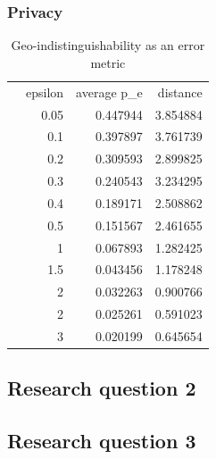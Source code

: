 \subsubsection{Privacy}
\begin{table}[h]
  \caption{Geo-indistinguishability as an error metric}
  \begin{tabular}{lrrr}
     & epsilon & average p\_e & distance \\
     & 0.05    & 0.447944     & 3.854884 \\
     & 0.1     & 0.397897     & 3.761739 \\
     & 0.2     & 0.309593     & 2.899825 \\
     & 0.3     & 0.240543     & 3.234295 \\
     & 0.4     & 0.189171     & 2.508862 \\
     & 0.5     & 0.151567     & 2.461655 \\
     & 1       & 0.067893     & 1.282425 \\
     & 1.5     & 0.043456     & 1.178248 \\
     & 2       & 0.032263     & 0.900766 \\
     & 2       & 0.025261     & 0.591023 \\
     & 3       & 0.020199     & 0.645654 \\
  \end{tabular}
\end{table}
\subsection{Research question 2}
\subsection{Research question 3}